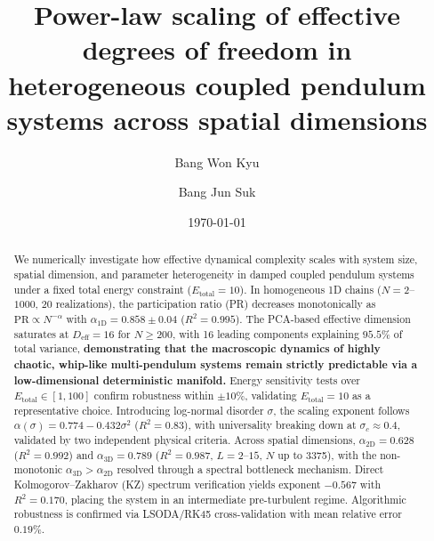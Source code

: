 \documentclass[aps,pre,12pt]{revtex4-2}
\begin{document}
\title{Power-law scaling of effective degrees of freedom in heterogeneous coupled pendulum systems across spatial dimensions}

\author{Bang Won Kyu}

\author{Bang Jun Suk}

\date{\today}

\begin{abstract}
We numerically investigate how effective dynamical complexity scales with system size, spatial dimension, and parameter heterogeneity in damped coupled pendulum systems under a fixed total energy constraint ($E_{\text{total}} = 10$). In homogeneous 1D chains ($N = 2$--$1000$, 20 realizations), the participation ratio (PR) decreases monotonically as $\text{PR} \propto N^{-\alpha}$ with $\alpha_{1\text{D}} = 0.858 \pm 0.04$ ($R^2 = 0.995$). The PCA-based effective dimension saturates at $D_{\text{eff}} = 16$ for $N \ge 200$, with 16 leading components explaining $95.5\%$ of total variance, \textbf{demonstrating that the macroscopic dynamics of highly chaotic, whip-like multi-pendulum systems remain strictly predictable via a low-dimensional deterministic manifold.} Energy sensitivity tests over $E_{\text{total}} \in [1, 100]$ confirm robustness within $\pm 10\%$, validating $E_{\text{total}} = 10$ as a representative choice. Introducing log-normal disorder $\sigma$, the scaling exponent follows $\alpha(\sigma) = 0.774 - 0.432\sigma^2$ ($R^2 = 0.83$), with universality breaking down at $\sigma_c \approx 0.4$, validated by two independent physical criteria. Across spatial dimensions, $\alpha_{2\text{D}} = 0.628$ ($R^2 = 0.992$) and $\alpha_{3\text{D}} = 0.789$ ($R^2 = 0.987$, $L = 2$--$15$, $N$ up to 3375), with the non-monotonic $\alpha_{3\text{D}} > \alpha_{2\text{D}}$ resolved through a spectral bottleneck mechanism. Direct Kolmogorov--Zakharov (KZ) spectrum verification yields exponent $-0.567$ with $R^2 = 0.170$, placing the system in an intermediate pre-turbulent regime. Algorithmic robustness is confirmed via LSODA/RK45 cross-validation with mean relative error $0.19\%$.
\end{abstract}

\maketitle
\end{document}
